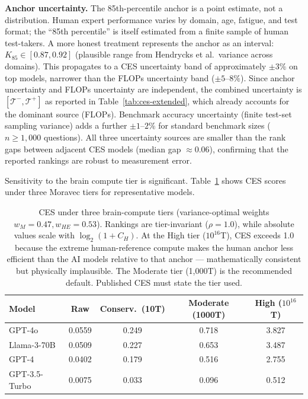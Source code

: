 \documentclass[12pt]{article}
\begin{document}
\noindent\textbf{Anchor uncertainty.} The 85th-percentile anchor is a point estimate, not a distribution. Human expert performance varies by domain, age, fatigue, and test format; the ``85th percentile'' is itself estimated from a finite sample of human test-takers. A more honest treatment represents the anchor as an interval: $K_{85} \in [0.87, 0.92]$ (plausible range from Hendrycks et al.\ variance across domains). This propagates to a CES uncertainty band of approximately $\pm 3\%$ on top models, narrower than the FLOPs uncertainty band ($\pm 5$--$8\%$). Since anchor uncertainty and FLOPs uncertainty are independent, the combined uncertainty is $[\mathcal{T}^-, \mathcal{T}^+]$ as reported in Table~\ref{tab:ces-extended}, which already accounts for the dominant source (FLOPs). Benchmark accuracy uncertainty (finite test-set sampling variance) adds a further $\pm 1$--$2\%$ for standard benchmark sizes ($n \geq 1{,}000$ questions). All three uncertainty sources are smaller than the rank gaps between adjacent CES models (median gap $\approx 0.06$), confirming that the reported rankings are robust to measurement error.

Sensitivity to the brain compute tier is significant. Table~\ref{tab:tier-sensitivity} shows CES scores under three Moravec tiers for representative models.

\begin{table}[H]
\centering
\small
\begin{tabular}{lcccc}
\toprule
\textbf{Model} & \textbf{Raw} & \textbf{Conserv.\ (10T)} & \textbf{Moderate (1000T)} & \textbf{High ($10^{16}$T)} \\
\midrule
GPT-4o        & 0.0559 & 0.249 & 0.718 & 3.827 \\
Llama-3-70B   & 0.0509 & 0.227 & 0.653 & 3.487 \\
GPT-4         & 0.0402 & 0.179 & 0.516 & 2.755 \\
GPT-3.5-Turbo & 0.0075 & 0.033 & 0.096 & 0.512 \\
\bottomrule
\end{tabular}
\caption{CES under three brain-compute tiers (variance-optimal weights $w_M=0.47, w_{HE}=0.53$). Rankings are tier-invariant ($\rho = 1.0$), while absolute values scale with $\log_2(1+C_H)$. At the High tier ($10^{16}$T), CES exceeds 1.0 because the extreme human-reference compute makes the human anchor less efficient than the AI models relative to that anchor --- mathematically consistent but physically implausible. The Moderate tier (1,000T) is the recommended default. Published CES must state the tier used.}
\label{tab:tier-sensitivity}
\end{table}
\end{document}
